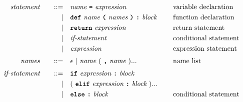 \begin{alignat*}{9}
&& \textit{statement}       && \quad ::= \quad & \textit{name}\ \textbf{\texttt{=}}\ \textit{expression}                                                           && \textrm{variable declaration}             \\
&&                          &&         | \quad & \textbf{\texttt{def}}\ \textit{name}\ \textbf{\texttt{(}}\ \textit{names}\ \textbf{\texttt{)}}
                                                 \ \textbf{\texttt{:}}\ \textit{block}\ \quad && \textrm{function declaration}                                                                                  \\
&&                          &&         | \quad & \textbf{\texttt{return}}\ \textit{expression}                                                                     && \textrm{return statement}                 \\
&&                          &&         | \quad & \textit{if-statement}\ \quad                                                                                      && \textrm{conditional statement}            \\
&&                          &&         | \quad & \textit{expression}                                                                                               && \textrm{expression statement}             \\[1mm]
&& \textit{names}           && \quad ::= \quad & \epsilon\ |\ \textit{name}\ (\ \textbf{\texttt{,}}\ \textit{name}\ ) ...                                          && \textrm{name list}                        \\[1mm]
&& \textit{if-statement}    && \quad ::= \quad & \textbf{\texttt{if}}\ \textit{expression}\ \textbf{\texttt{:}}\ \textit{block}                                                                                 \\
&&                          &&         | \quad & (\ \textbf{\texttt{elif}}\ \textit{expression}\ \textbf{\texttt{:}}\ \textit{block}\ )...                                                                      \\
&&                          &&         | \quad & \textbf{\texttt{else}}\ \textbf{\texttt{:}}\ \textit{block}                                                       && \textrm{conditional statement}            \\[1mm]

\end{alignat*}
